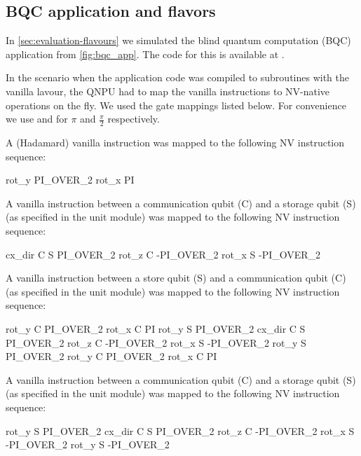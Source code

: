 \subsection{BQC application and flavors}
In \cref{sec:evaluation-flavours} we simulated the blind quantum computation
(BQC) application from \cref{fig:bqc_app}. The code for this is available at
\cite{git_squidasm}.

In the scenario when the application code was compiled to subroutines with the
vanilla lavour, the \ac{QNPU} had to map the vanilla instructions to NV-native
operations on the fly. We used the gate mappings listed below. For
convenience we use  and  for $\pi$ and $\frac{\pi}{2}$
respectively.

A  (Hadamard) vanilla instruction was mapped to the following NV instruction sequence:
\begin{nqcode}
  rot_y PI_OVER_2
  rot_x PI\end{nqcode}

A  vanilla instruction between a communication qubit (C) and a storage
qubit (S) (as specified in the unit module) was mapped to the following NV
instruction sequence:
\begin{nqcode}
  cx_dir C S PI_OVER_2
  rot_z C -PI_OVER_2
  rot_x S -PI_OVER_2\end{nqcode}

A  vanilla instruction between a store qubit (S) and a communication
qubit (C) (as specified in the unit module) was mapped to the following NV
instruction sequence:
\begin{nqcode}
  rot_y C PI_OVER_2
  rot_x C PI
  rot_y S PI_OVER_2
  cx_dir C S PI_OVER_2
  rot_z C -PI_OVER_2
  rot_x S -PI_OVER_2
  rot_y S PI_OVER_2
  rot_y C PI_OVER_2
  rot_x C PI\end{nqcode}

A  vanilla instruction between a communication qubit (C) and a storage
qubit (S) (as specified in the unit module) was mapped to the following NV
instruction sequence:
\begin{nqcode}
  rot_y S PI_OVER_2
  cx_dir C S PI_OVER_2
  rot_z C -PI_OVER_2
  rot_x S -PI_OVER_2
  rot_y S -PI_OVER_2\end{nqcode}


